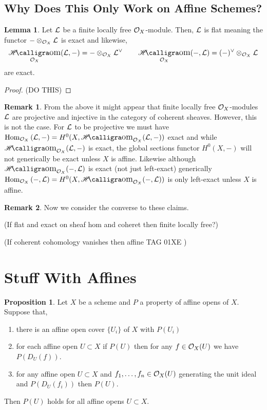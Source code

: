 \documentclass[12pt]{extarticle}
\DeclareMathOperator{\calHom}{\mathscr{H}\text{\kern -3pt {\calligra\large om}}}
\newcommand{\shHom}[3]{\calHom_{#1} \! \left( #2, #3 \right)}
\newcommand{\Hom}[3]{\mathrm{Hom}_{#1}\left( #2, #3 \right)}
\theoremstyle{definition}
\newtheorem{lemma}[theorem]{Lemma}
\newtheorem{proposition}[theorem]{Proposition}
\newtheorem{remark}{Remark}
\begin{document}
\subsection{Why Does This Only Work on Affine Schemes?}

\begin{lemma}
Let $\mathcal{L}$ be a finite locally free $\mathcal{O}_{X}$-module. Then, $\mathcal{L}$ is flat meaning the functor $- \otimes_{\mathcal{O}_{X}} \mathcal{L}$ is exact and likewise,
\[ \shHom{\struct{X}}{\L}{-} = - \otimes_{\struct{X}} \L^\vee \quad \quad \shHom{\struct{X}}{-}{\L} = (-)^\vee \otimes_{\struct{X}} \L \]
are exact. 
\end{lemma}

\begin{proof}
(DO THIS) 
\end{proof}

\begin{remark}
From the above it might appear that finite locally free $\mathcal{O}_{X}$-modules $\mathcal{L}$ are projective and injective in the category of coherent sheaves. However, this is not the case. For $\mathcal{L}$ to be projective we must have $\Hom{\struct{X}}{\L}{-} = H^0(X, \shHom{\struct{X}}{\L}{-})$ exact and while $\shHom{\struct{X}}{\L}{-}$ is exact, the global sections functor $H^0(X, -)$ will not generically be exact unless $X$ is affine. Likewise although $\shHom{\struct{X}}{-}{\L}$ is exact (not just left-exact) generically $\Hom{\struct{X}}{-}{\L} = H^0(X, \shHom{\struct{X}}{-}{\L})$ is only left-exact unless $X$ is affine.
\end{remark}

\begin{remark}
Now we consider the converse to these claims.
\end{remark}

(If flat and exact on sheaf hom and coheret then finite locally free?)

(If coherent cohomology vanishes then affine TAG 01XE )

\section{Stuff With Affines}

\begin{proposition}
Let $X$ be a scheme and $P$ a property of affine opens of $X$. Suppose that,
\begin{enumerate}
\item there is an affine open cover $\{ U_i \}$ of $X$ with $P(U_i)$
\item for each affine open $U \subset X$ if $P(U)$ then for any $f \in \mathcal{O}_{X}(U)$ we have $P(D_U(f))$.
\item for any affine open $U \subset X$ and $f_1, \dots, f_n \in \mathcal{O}_{X}(U)$ generating the unit ideal and $P(D_U(f_i))$ then $P(U)$.
\end{enumerate}
Then $P(U)$ holds for all affine opens $U \subset X$.
\end{proposition}
\end{document}
